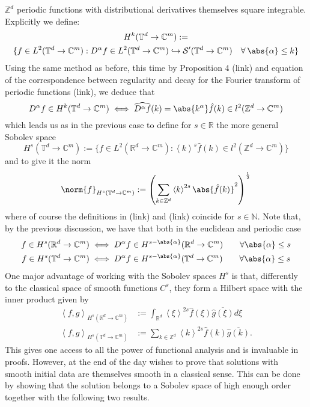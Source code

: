 \documentclass[
]{article}
\begin{document}
\({\mathbb Z}^d\) periodic functions with distributional derivatives
themselves square integrable. Explicitly we define: \[\begin{gathered}
\label{sobolevdef2}
    H^k({\mathbb T}^d\to\mathbb{C}^m):=\\\lbrace f\in L^2({\mathbb T}^d\to\mathbb{C}^m): D^\alpha f\in L^2({\mathbb T}^d\to\mathbb{C}^m)\hookrightarrow{\mathcal S}'({\mathbb T}^d\to\mathbb{C}^m)\quad\forall\hspace{2pt}\abs{\alpha}\leq k\rbrace\end{gathered}\]
Using the same method as before, this time by Proposition 4 (link) and
equation of the correspondence between regularity and decay for the
Fourier transform of periodic functions (link), we deduce that
\[D^\alpha f\in H^k({\mathbb T}^d\to\mathbb{C}^m)\iff\widehat{D^\alpha f}(k)=\abs{k^\alpha}\hat{f}(k)\in l^2({\mathbb Z}^d\to\mathbb{C}^m)\]
which leads us as in the previous case to define for \(s\in{\mathbb R}\)
the more general Sobolev space
\[H^s({\mathbb T}^d\to\mathbb{C}^m):=\lbrace f\in L^2({\mathbb R}^d\to\mathbb{C}^m): \left\langle k\right\rangle^{s}\hat{f}(k)\in l^2({\mathbb Z}^d\to\mathbb{C}^m)\rbrace\]
and to give it the norm \[\label{sobolevgeneraldef}
    \norm{f}_{H^s({\mathbb T}^d\to\mathbb{C}^m)}:=\left(\sum_{k\in{\mathbb Z}^d}\left\langle k\right\rangle^{2s}\abs{\hat{f}(k)}^2\right)^{\frac{1}{2}}\]
where of course the definitions in (link) and (link) coincide for
\(s\in\mathbb{N}\). Note that, by the previous discussion, we have that
both in the euclidean and periodic case \[\begin{aligned}
\label{Sobolev derivatives embedding}
    f\in H^s({\mathbb R}^d\to\mathbb{C}^m)  & \iff  D^\alpha f\in H^{s-\abs{\alpha}}({\mathbb R}^d\to\mathbb{C}^m)\qquad\forall\abs{\alpha}\leq s  \\
    f\in H^s({\mathbb T}^d\to\mathbb{C}^m) & \iff  D^\alpha f\in H^{s-\abs{\alpha}}({\mathbb T}^d\to\mathbb{C}^m)\qquad\forall\abs{\alpha}\leq s\end{aligned}\]
One major advantage of working with the Sobolev spaces \(H^s\) is that,
differently to the classical space of smooth functions \(C^s\), they
form a Hilbert space with the inner product given by \[\begin{aligned}
    \left\langle f,g\right\rangle_{H^s({\mathbb R}^d\to\mathbb{C}^m)}  & :=\int_{{\mathbb R}^d}\left\langle\xi \right\rangle^{2s}\hat{f}(\xi )\overline{\hat{g}(\xi )} d\xi \\
    \left\langle f,g\right\rangle_{H^s({\mathbb T}^d\to\mathbb{C}^m)} & :=\sum_{k\in {\mathbb Z}^d} \left\langle k \right\rangle^{2s}\hat{f}(k)\overline{\widehat{g}(k )}.\end{aligned}\]
This gives one access to all the power of functional analysis and is
invaluable in proofs. However, at the end of the day wishes to prove
that solutions with smooth initial data are themselves smooth in a
classical sense. This can be done by showing that the solution belongs
to a Sobolev space of high enough order together with the following two
results.
\end{document}
